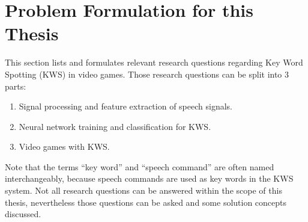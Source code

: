 
\section{Problem Formulation for this Thesis}\label{sec:intro_rq}
\thesisStateRevised
This section lists and formulates relevant research questions regarding Key Word Spotting (KWS) in video games.
Those research questions can be split into 3 parts:
\begin{enumerate}[label={Q.\arabic*)}, leftmargin=1.4cm]
  \item Signal processing and feature extraction of speech signals.
  \item Neural network training and classification for KWS.
  \item Video games with KWS.
\end{enumerate}
Note that the terms \enquote{key word} and \enquote{speech command} are often named interchangeably, because speech commands are used as key words in the KWS system.
Not all research questions can be answered within the scope of this thesis, nevertheless those questions can be asked and some solution concepts discussed.



